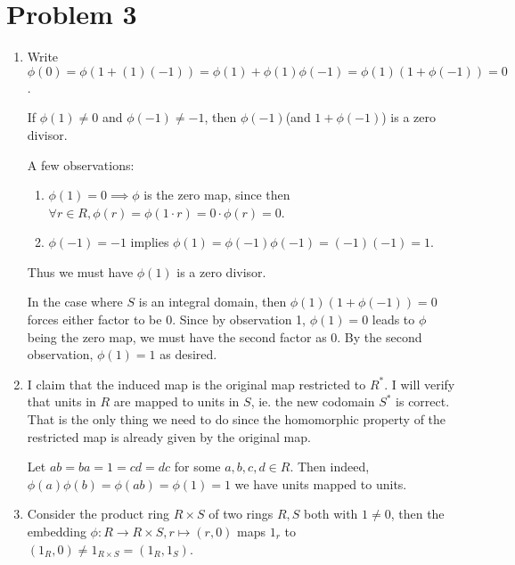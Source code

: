 \documentclass{article}
\theoremstyle{plain}
\begin{document}
\section*{Problem 3}
\begin{enumerate}
	\item Write $\phi(0)=\phi(1+(1)(-1))=\phi(1)+\phi(1)\phi(-1)=\phi(1)(1+\phi(-1))=0$.

	      If $\phi(1)\neq0$ and $\phi(-1)\neq-1$, then $\phi(-1)$(and $1+\phi(-1)$) is a zero divisor.

	      A few observations:
	      \begin{enumerate}
		      \item $\phi(1)=0\implies\phi$ is the zero map, since then
		            $\forall r\in R, \phi(r)=\phi(1\cdot r)=0\cdot\phi(r)=0$.
		      \item $\phi(-1)=-1$ implies $\phi(1)=\phi(-1)\phi(-1)=(-1)(-1)=1$.
	      \end{enumerate}
	      Thus we must have $\phi(1)$ is a zero divisor.

	      In the case where $S$ is an integral domain, then $\phi(1)(1+\phi(-1))=0$ forces
	      either factor to be $0$. Since by observation 1, $\phi(1)=0$ leads to $\phi$ being
	      the zero map, we must have the second factor as 0. By the second observation,
	      $\phi(1)=1$ as desired.


	\item I claim that the induced map is the original map restricted to $R^{*}$.
	      I will verify that units in $R$ are mapped to units in $S$, ie. the new
	      codomain $S^{*}$ is correct. That is the only thing we need to do
	      since the homomorphic property of the restricted map is already given
	      by the original map.

	      Let $ab=ba=1=cd=dc$ for some $a,b,c,d\in R$. Then indeed,
	      $\phi(a)\phi(b)=\phi(ab)=\phi(1)=1$ we have units mapped to units.


	\item Consider the product ring $R\times S$ of two rings $R, S$ both with $1\neq0$, then the
	      embedding $\phi:R\to R\times S, r\mapsto(r,0)$ maps $1_{r}$ to $(1_R, 0)\neq1_{R\times S}=(1_{R},1_{S})$.
\end{enumerate}
\end{document}
